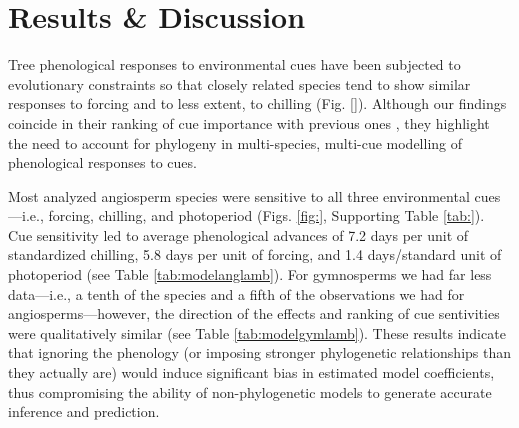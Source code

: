 \documentclass{article}\usepackage[]{graphicx}\usepackage[]{color}
\begin{document}








\section*{Results \& Discussion}


Tree phenological responses to environmental cues have been subjected to evolutionary constraints so that closely related species tend to show similar responses to forcing and to less extent, to chilling (Fig. \ref{}). Although our findings coincide in their ranking of cue importance with previous ones \citep{ettinger2020}, they highlight the need to account for phylogeny in multi-species, multi-cue modelling of phenological responses to cues.  

Most analyzed angiosperm species were sensitive to all three environmental cues---i.e., forcing, chilling, and photoperiod (Figs. \ref{fig:}, Supporting Table \ref{tab:}). Cue sensitivity led to average phenological advances of 7.2 days per unit of standardized chilling, 5.8 days per unit of forcing, and 1.4 days/standard unit of photoperiod (see Table \ref{tab:modelanglamb}). For gymnosperms we had far less data---i.e., a tenth of the species and a fifth of the observations we had for angiosperms---however, the direction of the effects and ranking of cue sentivities were qualitatively similar (see Table \ref{tab:modelgymlamb}). These results indicate that ignoring the phenology (or imposing stronger phylogenetic relationships than they actually are) would induce significant bias in estimated model coefficients, thus compromising the ability of non-phylogenetic models to generate accurate inference and prediction.\\
\end{document}
